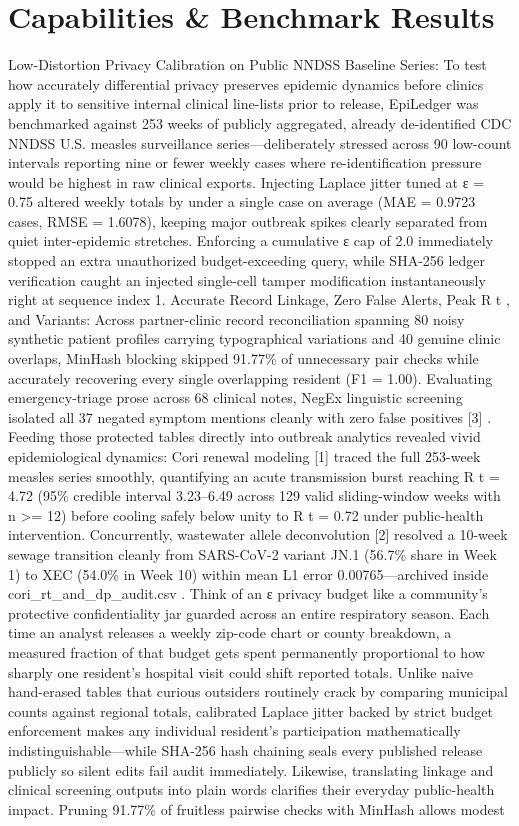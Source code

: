 \documentclass[10pt,letterpaper]{article}
\begin{document}
\section{Capabilities \& Benchmark Results}
Low-Distortion Privacy Calibration on Public NNDSS Baseline Series: To test how accurately differential privacy preserves epidemic dynamics before clinics apply it to sensitive internal clinical line-lists prior to release, EpiLedger was benchmarked against 253 weeks of publicly aggregated, already de-identified CDC NNDSS U.S. measles surveillance series---deliberately stressed across 90 low-count intervals reporting nine or fewer weekly cases where re-identification pressure would be highest in raw clinical exports. Injecting Laplace jitter tuned at ε = 0.75 altered weekly totals by under a single case on average (MAE = 0.9723 cases, RMSE = 1.6078), keeping major outbreak spikes clearly separated from quiet inter-epidemic stretches. Enforcing a cumulative ε cap of 2.0 immediately stopped an extra unauthorized budget-exceeding query, while SHA-256 ledger verification caught an injected single-cell tamper modification instantaneously right at sequence index 1. Accurate Record Linkage, Zero False Alerts, Peak R t , and Variants: Across partner-clinic record reconciliation spanning 80 noisy synthetic patient profiles carrying typographical variations and 40 genuine clinic overlaps, MinHash blocking skipped 91.77\% of unnecessary pair checks while accurately recovering every single overlapping resident (F1 = 1.00). Evaluating emergency-triage prose across 68 clinical notes, NegEx linguistic screening isolated all 37 negated symptom mentions cleanly with zero false positives [3] . Feeding those protected tables directly into outbreak analytics revealed vivid epidemiological dynamics: Cori renewal modeling [1] traced the full 253-week measles series smoothly, quantifying an acute transmission burst reaching R t = 4.72 (95\% credible interval 3.23--6.49 across 129 valid sliding-window weeks with n >= 12) before cooling safely below unity to R t = 0.72 under public-health intervention. Concurrently, wastewater allele deconvolution [2] resolved a 10-week sewage transition cleanly from SARS-CoV-2 variant JN.1 (56.7\% share in Week 1) to XEC (54.0\% in Week 10) within mean L1 error 0.00765---archived inside cori\_rt\_and\_dp\_audit.csv . Think of an ε privacy budget like a community's protective confidentiality jar guarded across an entire respiratory season. Each time an analyst releases a weekly zip-code chart or county breakdown, a measured fraction of that budget gets spent permanently proportional to how sharply one resident's hospital visit could shift reported totals. Unlike naive hand-erased tables that curious outsiders routinely crack by comparing municipal counts against regional totals, calibrated Laplace jitter backed by strict budget enforcement makes any individual resident's participation mathematically indistinguishable---while SHA-256 hash chaining seals every published release publicly so silent edits fail audit immediately. Likewise, translating linkage and clinical screening outputs into plain words clarifies their everyday public-health impact. Pruning 91.77\% of fruitless pairwise checks with MinHash allows modest 
\end{document}
